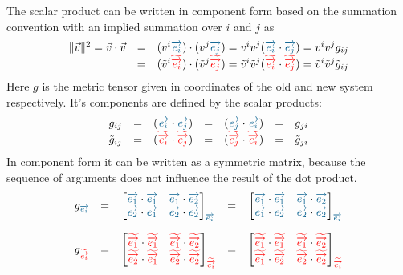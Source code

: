 The scalar product can be written in component form based on the summation convention with
an implied summation over $i$ and $j$ as
\begin{equation}
    \begin{array}{rcl}
        \|\vec{v}\|^2 = \vec{v} \cdot \vec{v} & = & (v^i \hdbv{i}) \cdot (v^j \hdbv{j})
                        = v^i v^j (\hdbv{i}\cdot\hdbv{j})
                        = v^i v^j g_{ij} \\
        & = & (\tilde{v}^i \hdbtv{i}) \cdot (\tilde{v}^j \hdbtv{j})
          = \tilde{v}^i \tilde{v}^j (\hdbtv{i}\cdot\hdbtv{j})
          = \tilde{v}^i \tilde{v}^j \tilde{g}_{ij}
    \end{array}
\end{equation}
Here $g$ is the metric tensor given in coordinates of the old and new system respectively.
It's components are defined by the scalar products:
\begin{equation}
    \begin{array}{rclrclrcl}
        g_{ij} & = & (\hdbv{i}\cdot\hdbv{j}) & = &
        (\hdbv{j}\cdot\hdbv{i}) & = & g_{ji} \\
        \tilde{g}_{ij} & = & (\hdbtv{i}\cdot\hdbtv{j}) & = &
        (\hdbtv{j}\cdot\hdbtv{i}) & = &  \tilde{g}_{ji}
    \end{array}
\end{equation}
In component form it can be written as a symmetric matrix, because the sequence of
arguments does not influence the result of the dot product.
\begin{equation}
    \begin{array}{rclrcl}
        g_{\hdbv{i}}& = &
        \prescript{}{}{\begin{bmatrix}
            \hdbv{1}\cdot\hdbv{1} & \hdbv{1}\cdot\hdbv{2} \\
            \hdbv{2}\cdot\hdbv{1} & \hdbv{2}\cdot\hdbv{2} 
        \end{bmatrix}_{\hdbv{i}}}
        & = &
        \prescript{}{}{\begin{bmatrix}
            \hdbv{1}\cdot\hdbv{1} & \hdbv{1}\cdot\hdbv{2} \\
            \hdbv{1}\cdot\hdbv{2} & \hdbv{2}\cdot\hdbv{2} 
        \end{bmatrix}_{\hdbv{i}}} \\
        \noalign{\vskip10pt}
        g_{\hdbtv{i}}& = &
        \prescript{}{}{\begin{bmatrix}
            \hdbtv{1}\cdot\hdbtv{1} & \hdbtv{1}\cdot\hdbtv{2} \\
            \hdbtv{2}\cdot\hdbtv{1} & \hdbtv{2}\cdot\hdbtv{2} 
        \end{bmatrix}_{\hdbtv{i}}}
        & = &
        \prescript{}{}{\begin{bmatrix}
            \hdbtv{1}\cdot\hdbtv{1} & \hdbtv{1}\cdot\hdbtv{2} \\
            \hdbtv{1}\cdot\hdbtv{2} & \hdbtv{2}\cdot\hdbtv{2} 
        \end{bmatrix}_{\hdbtv{i}}}
    \end{array}
\end{equation}


